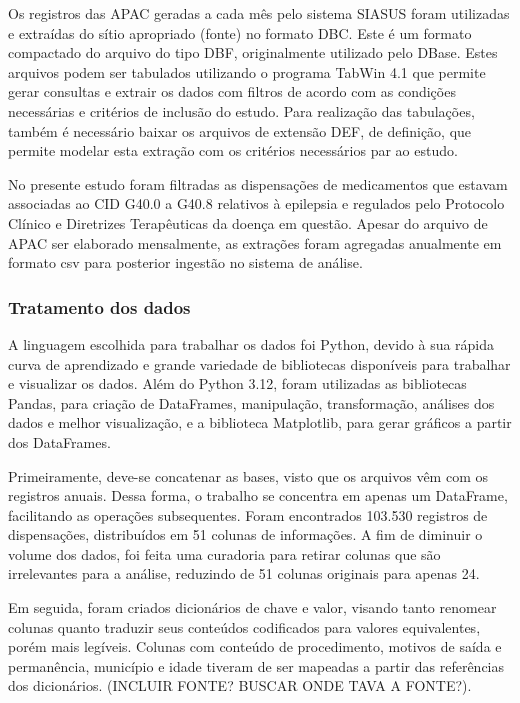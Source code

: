 \documentclass[article,a4paper,12pt,brazil,sumario=tradicional]{abntex2}
\begin{document}
Os registros das APAC geradas a cada mês pelo sistema SIASUS foram utilizadas e extraídas do sítio apropriado (fonte) no formato DBC. Este é um formato compactado do arquivo do tipo DBF, originalmente utilizado pelo DBase. Estes arquivos podem ser tabulados utilizando o programa TabWin 4.1 que permite gerar consultas e extrair os dados com filtros de acordo com as condições necessárias e critérios de inclusão do estudo. Para realização das tabulações, também é necessário baixar os arquivos de extensão DEF, de definição, que permite modelar esta extração com os critérios necessários par ao estudo.

No presente estudo foram filtradas as dispensações de medicamentos que estavam associadas ao CID G40.0 a G40.8 relativos à epilepsia e regulados pelo Protocolo Clínico e Diretrizes Terapêuticas da doença em questão. Apesar do arquivo de APAC ser elaborado mensalmente, as extrações foram agregadas anualmente em formato csv para posterior ingestão no sistema de análise.

\subsubsection{Tratamento dos dados}
 
A linguagem escolhida para trabalhar os dados foi Python, devido à sua rápida curva de aprendizado e grande variedade de bibliotecas disponíveis para trabalhar e visualizar os dados. Além do Python 3.12, foram utilizadas as bibliotecas Pandas, para criação de DataFrames, manipulação, transformação, análises dos dados e melhor visualização, e a biblioteca Matplotlib, para gerar gráficos a partir dos DataFrames.

Primeiramente, deve-se concatenar as bases, visto que os arquivos vêm com os registros anuais. Dessa forma, o trabalho se concentra em apenas um DataFrame, facilitando as operações subsequentes. Foram encontrados 103.530 registros de dispensações, distribuídos em 51 colunas de informações. A fim de diminuir o volume dos dados, foi feita uma curadoria para retirar colunas que são irrelevantes para a análise, reduzindo de 51 colunas originais para apenas 24.

Em seguida, foram criados dicionários de chave e valor, visando tanto renomear colunas quanto traduzir seus conteúdos codificados para valores equivalentes, porém mais legíveis. Colunas com conteúdo de procedimento, motivos de saída e permanência, município e idade tiveram de ser mapeadas a partir das referências dos dicionários. (INCLUIR FONTE? BUSCAR ONDE TAVA A FONTE?).
\end{document}
